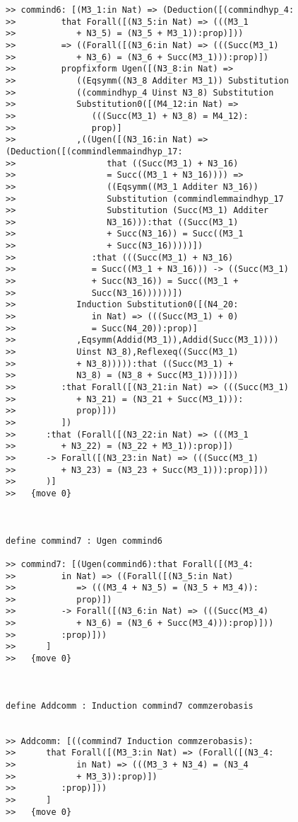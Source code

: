 \documentclass[12pt]{article}
\begin{document}
\begin{verbatim}
>> commind6: [(M3_1:in Nat) => (Deduction([(commindhyp_4:
>>         that Forall([(N3_5:in Nat) => (((M3_1
>>            + N3_5) = (N3_5 + M3_1)):prop)]))
>>         => ((Forall([(N3_6:in Nat) => (((Succ(M3_1)
>>            + N3_6) = (N3_6 + Succ(M3_1))):prop)])
>>         propfixform Ugen([(N3_8:in Nat) =>
>>            ((Eqsymm((N3_8 Additer M3_1)) Substitution
>>            ((commindhyp_4 Uinst N3_8) Substitution
>>            Substitution0([(M4_12:in Nat) =>
>>               (((Succ(M3_1) + N3_8) = M4_12):
>>               prop)]
>>            ,((Ugen([(N3_16:in Nat) => (Deduction([(commindlemmaindhyp_17:
>>                  that ((Succ(M3_1) + N3_16)
>>                  = Succ((M3_1 + N3_16)))) =>
>>                  ((Eqsymm((M3_1 Additer N3_16))
>>                  Substitution (commindlemmaindhyp_17
>>                  Substitution (Succ(M3_1) Additer
>>                  N3_16))):that ((Succ(M3_1)
>>                  + Succ(N3_16)) = Succ((M3_1
>>                  + Succ(N3_16)))))])
>>               :that (((Succ(M3_1) + N3_16)
>>               = Succ((M3_1 + N3_16))) -> ((Succ(M3_1)
>>               + Succ(N3_16)) = Succ((M3_1 +
>>               Succ(N3_16))))))])
>>            Induction Substitution0([(N4_20:
>>               in Nat) => (((Succ(M3_1) + 0)
>>               = Succ(N4_20)):prop)]
>>            ,Eqsymm(Addid(M3_1)),Addid(Succ(M3_1))))
>>            Uinst N3_8),Reflexeq((Succ(M3_1)
>>            + N3_8))))):that ((Succ(M3_1) +
>>            N3_8) = (N3_8 + Succ(M3_1))))]))
>>         :that Forall([(N3_21:in Nat) => (((Succ(M3_1)
>>            + N3_21) = (N3_21 + Succ(M3_1))):
>>            prop)]))
>>         ])
>>      :that (Forall([(N3_22:in Nat) => (((M3_1
>>         + N3_22) = (N3_22 + M3_1)):prop)])
>>      -> Forall([(N3_23:in Nat) => (((Succ(M3_1)
>>         + N3_23) = (N3_23 + Succ(M3_1))):prop)]))
>>      )]
>>   {move 0}



define commind7 : Ugen commind6

>> commind7: [(Ugen(commind6):that Forall([(M3_4:
>>         in Nat) => ((Forall([(N3_5:in Nat)
>>            => (((M3_4 + N3_5) = (N3_5 + M3_4)):
>>            prop)])
>>         -> Forall([(N3_6:in Nat) => (((Succ(M3_4)
>>            + N3_6) = (N3_6 + Succ(M3_4))):prop)]))
>>         :prop)]))
>>      ]
>>   {move 0}



define Addcomm : Induction commind7 commzerobasis


>> Addcomm: [((commind7 Induction commzerobasis):
>>      that Forall([(M3_3:in Nat) => (Forall([(N3_4:
>>            in Nat) => (((M3_3 + N3_4) = (N3_4
>>            + M3_3)):prop)])
>>         :prop)]))
>>      ]
>>   {move 0}




\end{verbatim}
\end{document}
